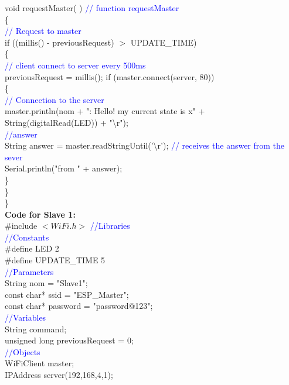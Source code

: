 \documentclass[12pt,a4paper]{article}
\begin{document}
void requestMaster( ) \textcolor{blue}{// function requestMaster }\\
\{\\ \textcolor{blue}{// Request to master}\\
 if ((millis() - previousRequest) $>$ UPDATE\_TIME)\\
\{\\ \textcolor{blue}{// client connect to server every 500ms}\\
   previousRequest = millis();
   if (master.connect(server, 80))\\ 
\{\\\textcolor{blue}{ // Connection to the server}\\
     master.println(nom + ": Hello! my current state is x" +\\ String(digitalRead(LED)) + "\textbackslash r");\\
     \textcolor{blue}{//answer}\\
     String answer = master.readStringUntil('\textbackslash r');   \textcolor{blue}{// receives the answer from the sever}\\
     Serial.println("from " + answer);\\
   \}\\
 \}\\
\}\\
\vspace{10mm}
\setlength{\parindent}{0eM}
\hspace{1cm}\textbf{\large Code for Slave 1:}\\[6pt]
\setlength{\parindent}{5eM}
\#include $<WiFi.h>$  \textcolor{blue}{//Libraries}\\
 \textcolor{blue}{//Constants}\\
\#define LED 2 \\
\#define UPDATE\_TIME 5\\
 \textcolor{blue}{//Parameters}\\
String nom = "Slave1";\\
const char* ssid = "ESP\_Master";\\
const char* password = "password@123";\\
 \textcolor{blue}{//Variables}\\
String command;\\
unsigned long previousRequest = 0;\\
 \textcolor{blue}{//Objects}\\
WiFiClient master;\\
IPAddress server(192,168,4,1);\\[15pt]
\end{document}

